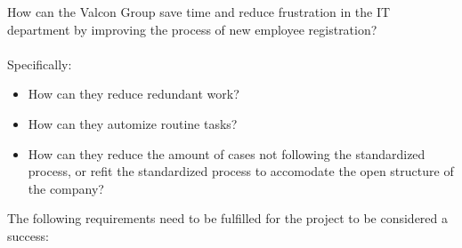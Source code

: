 \label{app:problem_statement}
How can the Valcon Group save time and reduce frustration in the IT department by improving the process of new employee registration?
\\\\
Specifically:
\begin{itemize}
\item How can they reduce redundant work?
\item How can they automize routine tasks?
\item How can they reduce the amount of cases not following the standardized process, or refit the standardized process to accomodate the open structure of the company?
\end{itemize}

The following requirements need to be fulfilled for the project to be considered a success:
